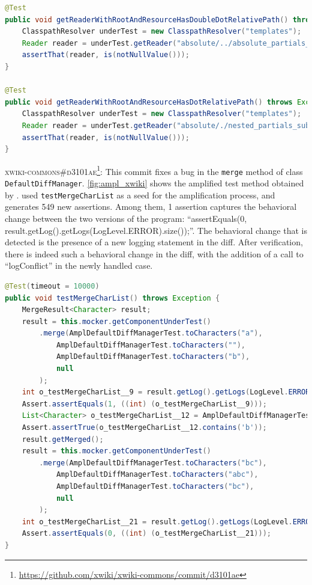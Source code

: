 \begin{lstlisting}[language=java,caption=Developer test for \textsc{774ae7a} of Mustache.java.,label=fig:diff_mustache]
@Test
public void getReaderWithRootAndResourceHasDoubleDotRelativePath() throws Exception {
	ClasspathResolver underTest = new ClasspathResolver("templates");
	Reader reader = underTest.getReader("absolute/../absolute_partials_template.html");
	assertThat(reader, is(notNullValue()));
}

@Test
public void getReaderWithRootAndResourceHasDotRelativePath() throws Exception {
	ClasspathResolver underTest = new ClasspathResolver("templates");
	Reader reader = underTest.getReader("absolute/./nested_partials_sub.html");
	assertThat(reader, is(notNullValue()));
}
\end{lstlisting}

\textsc{xwiki-commons\#d3101ae}\footnote{\url{https://github.com/xwiki/xwiki-commons/commit/d3101ae}}: This commit fixes a bug in the \texttt{merge} method of class \texttt{DefaultDiffManager}.
\autoref{fig:ampl_xwiki} shows the amplified test method obtained by \DCIA.
\DCI used \texttt{testMergeCharList} as a seed for the amplification process, and generates 549 new assertions.
Among them, 1 assertion captures the behavioral change between the two versions of the program: 
``assertEquals(0, result.getLog().getLogs(LogLevel.ERROR).size());''.
The behavioral change that is detected is the presence of a new logging statement in the diff. 
After verification, there is indeed such a behavioral change in the diff, with the addition of a call to ``logConflict'' in the newly handled case.

\begin{lstlisting}[language=java,caption=Test generated by \DCIA that detects the behavioral change of \textsc{d3101ae} of XWiki.,label=fig:ampl_xwiki]
@Test(timeout = 10000)
public void testMergeCharList() throws Exception {
	MergeResult<Character> result;
	result = this.mocker.getComponentUnderTest()
		.merge(AmplDefaultDiffManagerTest.toCharacters("a"), 
			AmplDefaultDiffManagerTest.toCharacters(""), 
			AmplDefaultDiffManagerTest.toCharacters("b"), 
			null
		);
	int o_testMergeCharList__9 = result.getLog().getLogs(LogLevel.ERROR).size();
	Assert.assertEquals(1, ((int) (o_testMergeCharList__9)));
	List<Character> o_testMergeCharList__12 = AmplDefaultDiffManagerTest.toCharacters("b");
	Assert.assertTrue(o_testMergeCharList__12.contains('b'));
	result.getMerged();
	result = this.mocker.getComponentUnderTest()
		.merge(AmplDefaultDiffManagerTest.toCharacters("bc"), 
			AmplDefaultDiffManagerTest.toCharacters("abc"), 
			AmplDefaultDiffManagerTest.toCharacters("bc"), 
			null
		);
	int o_testMergeCharList__21 = result.getLog().getLogs(LogLevel.ERROR).size();
	Assert.assertEquals(0, ((int) (o_testMergeCharList__21)));
}
\end{lstlisting}

